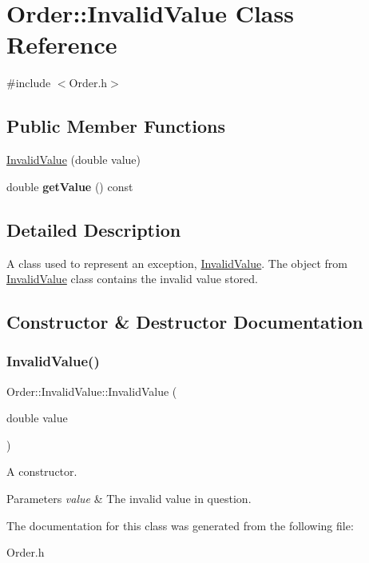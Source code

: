 \hypertarget{class_order_1_1_invalid_value}{}\section{Order\+:\+:Invalid\+Value Class Reference}
\label{class_order_1_1_invalid_value}


{\ttfamily \#include $<$Order.\+h$>$}

\subsection*{Public Member Functions}
\begin{DoxyCompactItemize}
\item 
\hyperlink{class_order_1_1_invalid_value_ab53ffc26a22a982511ec21973dd1bb33}{Invalid\+Value} (double value)
\item 
\hypertarget{class_order_1_1_invalid_value_ace0e354a52acbe82fa55aa460935a291}{}\label{class_order_1_1_invalid_value_ace0e354a52acbe82fa55aa460935a291} 
double {\bfseries get\+Value} () const
\end{DoxyCompactItemize}


\subsection{Detailed Description}
A class used to represent an exception, \hyperlink{class_order_1_1_invalid_value}{Invalid\+Value}. The object from \hyperlink{class_order_1_1_invalid_value}{Invalid\+Value} class contains the invalid value stored. 

\subsection{Constructor \& Destructor Documentation}
\hypertarget{class_order_1_1_invalid_value_ab53ffc26a22a982511ec21973dd1bb33}{}\label{class_order_1_1_invalid_value_ab53ffc26a22a982511ec21973dd1bb33} 
\subsubsection{\texorpdfstring{Invalid\+Value()}{InvalidValue()}}
{\footnotesize\ttfamily Order\+::\+Invalid\+Value\+::\+Invalid\+Value (\begin{DoxyParamCaption}\item[{double}]{value }\end{DoxyParamCaption})\hspace{0.3cm}{\ttfamily [inline]}}

A constructor. 
\begin{DoxyParams}{Parameters}
{\em value} & The invalid value in question. \\
\hline
\end{DoxyParams}


The documentation for this class was generated from the following file\+:\begin{DoxyCompactItemize}
\item 
Order.\+h\end{DoxyCompactItemize}

